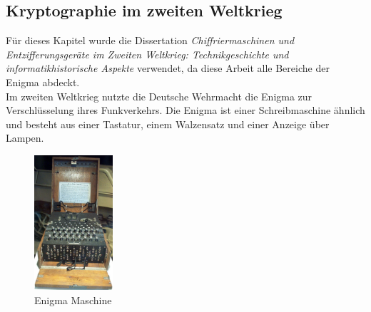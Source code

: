\subsection{Kryptographie im zweiten Weltkrieg}
Für dieses Kapitel wurde die Dissertation \textit{Chiffriermaschinen und Entzifferungsgeräte
im Zweiten Weltkrieg: Technikgeschichte und informatikhistorische Aspekte} \cite{enigma} verwendet, da diese Arbeit alle Bereiche der Enigma abdeckt. \\
Im zweiten Weltkrieg nutzte die Deutsche Wehrmacht die Enigma zur Verschlüsselung ihres Funkverkehrs. Die Enigma ist einer Schreibmaschine ähnlich und besteht aus einer Tastatur, einem Walzensatz und einer Anzeige über Lampen. 
%
\begin{figure}[ht]
\begin{center}
\includegraphics[height=5cm]{images/Enigma_Verkehrshaus_Luzern_cropped.jpg}
\caption{Enigma Maschine}
\label{fig:enigma}
\end{center}
\end{figure}
%
